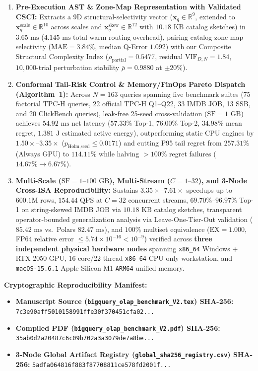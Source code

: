 \documentclass[11pt,a4paper]{article}
\begin{document}
\begin{enumerate}
  \item \textbf{Pre-Execution AST \& Zone-Map Representation with Validated CSCI:} Extracts a 9D structural-selectivity vector ($\mathbf{x}_q \in \mathbb{R}^{9}$, extended to $\mathbf{x}_q^{\text{scale}} \in \mathbb{R}^{10}$ across scales and $\mathbf{x}_q^{\text{skew}} \in \mathbb{R}^{12}$ with $10.18\text{ KB}$ catalog sketches) in $3.65\text{ ms}$ ($4.145\text{ ms}$ total warm routing overhead), pairing catalog zone-map selectivity ($\text{MAE}=3.84\%$, median Q-Error $1.092$) with our Composite Structural Complexity Index ($\rho_{\text{partial}}=0.5477$, residual $\text{VIF}_{D,N}=1.84$, $10{,}000$-trial perturbation stability $\bar{\rho}=0.9880$ at $\pm 20\%$).
  \item \textbf{Conformal Tail-Risk Control \& Memory/FinOps Pareto Dispatch (Algorithm~1):} Across $N=163$ queries spanning five benchmark suites (75 factorial TPC-H queries, 22 official TPC-H Q1--Q22, 33 IMDB JOB, 13 SSB, and 20 ClickBench queries), leak-free 25-seed cross-validation ($\text{SF}=1\text{ GB}$) achieves $54.92\text{ ms}$ net latency ($57.33\%$ Top-1, $76.00\%$ Top-2, $34.98\%$ mean regret, $1.381\text{ J}$ estimated active energy), outperforming static CPU engines by $1.50\times\text{--}3.35\times$ ($p_{\text{Holm,seed}} \le 0.0171$) and cutting P95 tail regret from $257.31\%$ (Always GPU) to $114.11\%$ while halving $>100\%$ regret failures ($14.67\% \rightarrow 6.67\%$).
  \item \textbf{Multi-Scale ($\text{SF}=1\text{--}100\text{ GB}$), Multi-Stream ($C=1\text{--}32$), and 3-Node Cross-ISA Reproducibility:} Sustains $3.35\times\text{--}7.61\times$ speedups up to $600.1\text{M}$ rows, $154.44\text{ QPS}$ at $C=32$ concurrent streams, $69.70\%\text{--}96.97\%$ Top-1 on string-skewed IMDB JOB via $10.18\text{ KB}$ catalog sketches, transparent operator-bounded generalization analysis via Leave-One-Tier-Out validation ($85.42\text{ ms}$ vs.\ Polars $82.47\text{ ms}$), and $100\%$ multiset equivalence ($\text{EX}=1.000$, FP64 relative error $\le 5.74\times 10^{-16} < 10^{-9}$) verified across \textbf{three independent physical hardware nodes} spanning \texttt{x86\_64} Windows + RTX 2050 GPU, 16-core/22-thread \texttt{x86\_64} CPU-only workstation, and \texttt{macOS-15.6.1} Apple Silicon M1 \texttt{ARM64} unified memory.
\end{enumerate}

\textbf{Cryptographic Reproducibility Manifest:}
\begin{itemize}
  \item \textbf{Manuscript Source (\texttt{bigquery\_olap\_benchmark\_V2.tex}) SHA-256:} \texttt{7c3e90aff5010158991ffe30f370451cfa02...}
  \item \textbf{Compiled PDF (\texttt{bigquery\_olap\_benchmark\_V2.pdf}) SHA-256:} \texttt{35ab0d2a20487c6c09b702a3a3079de7a8be...}
  \item \textbf{3-Node Global Artifact Registry (\texttt{global\_sha256\_registry.csv}) SHA-256:} \texttt{5adfa064816f883f87708811ce578fd2001f...}
\end{itemize}
\end{document}
